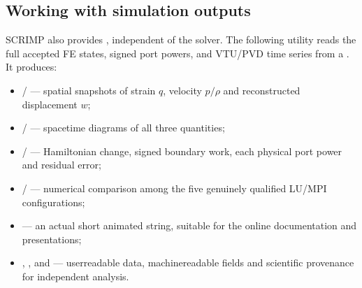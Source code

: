 \documentclass[letterpaper,10pt,english]{sphinxmanual}
\begin{document}
\subsection{Working with simulation outputs}
\label{\detokenize{started:working-with-simulation-outputs}}
\sphinxAtStartPar
SCRIMP also provides , independent of the solver. The following
utility reads the full accepted FE states, signed port powers,
 and  VTU/PVD time series from a . It produces:
\begin{itemize}
\item {} 
\sphinxAtStartPar
{} /  — spatial snapshots of
strain \(q\), velocity \(p/\rho\) and reconstructed
displacement \(w\);

\item {} 
\sphinxAtStartPar
{} /  — space\sphinxhyphen{}time diagrams
of all three quantities;

\item {} 
\sphinxAtStartPar
{} /  — Hamiltonian
change, signed boundary work, each physical port power and
residual error;

\item {} 
\sphinxAtStartPar
{} /  — numerical comparison
among the five genuinely qualified LU/MPI configurations;

\item {} 
\sphinxAtStartPar
{} — an actual short animated string,
suitable for the online documentation and presentations;

\item {} 
\sphinxAtStartPar
{}, ,
 and  —
user\sphinxhyphen{}readable data, machine\sphinxhyphen{}readable fields and scientific
provenance for independent analysis.

\end{itemize}
\end{document}
